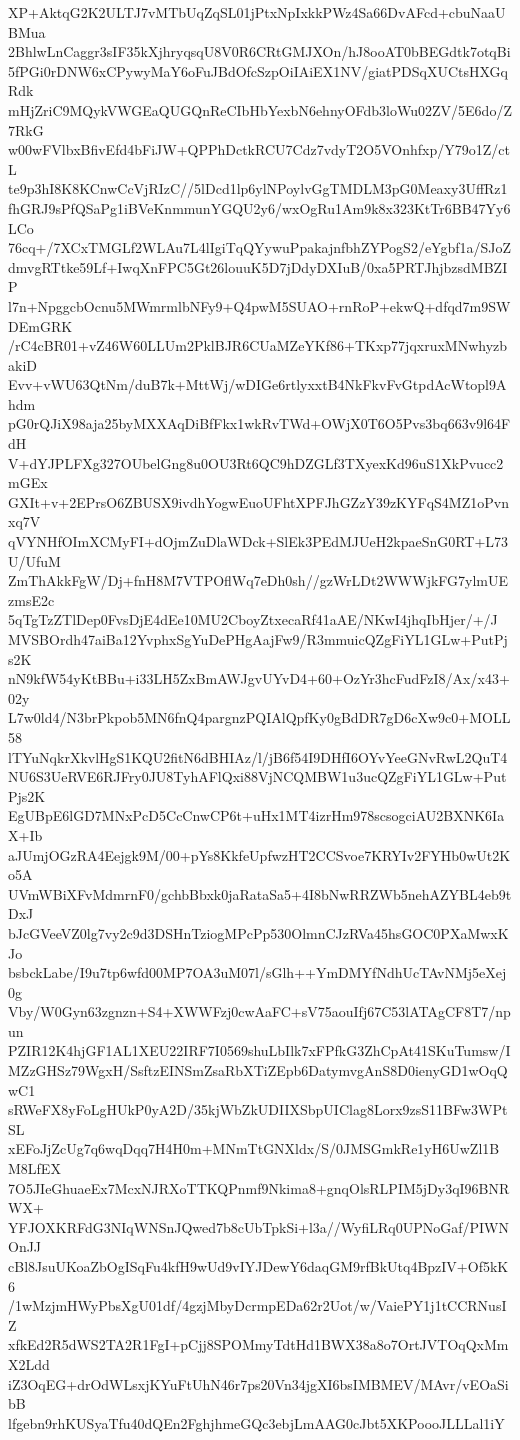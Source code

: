 XP+AktqG2K2ULTJ7vMTbUqZqSL01jPtxNpIxkkPWz4Sa66DvAFcd+cbuNaaUBMua
2BhlwLnCaggr3sIF35kXjhryqsqU8V0R6CRtGMJXOn/hJ8ooAT0bBEGdtk7otqBi
5fPGi0rDNW6xCPywyMaY6oFuJBdOfcSzpOiIAiEX1NV/giatPDSqXUCtsHXGqRdk
mHjZriC9MQykVWGEaQUGQnReCIbHbYexbN6ehnyOFdb3loWu02ZV/5E6do/Z7RkG
w00wFVlbxBfivEfd4bFiJW+QPPhDctkRCU7Cdz7vdyT2O5VOnhfxp/Y79o1Z/ctL
te9p3hI8K8KCnwCcVjRIzC//5lDcd1lp6ylNPoylvGgTMDLM3pG0Meaxy3UffRz1
fhGRJ9sPfQSaPg1iBVeKnmmunYGQU2y6/wxOgRu1Am9k8x323KtTr6BB47Yy6LCo
76cq+/7XCxTMGLf2WLAu7L4lIgiTqQYywuPpakajnfbhZYPogS2/eYgbf1a/SJoZ
dmvgRTtke59Lf+IwqXnFPC5Gt26louuK5D7jDdyDXIuB/0xa5PRTJhjbzsdMBZIP
l7n+NpggcbOcnu5MWmrmlbNFy9+Q4pwM5SUAO+rnRoP+ekwQ+dfqd7m9SWDEmGRK
/rC4cBR01+vZ46W60LLUm2PklBJR6CUaMZeYKf86+TKxp77jqxruxMNwhyzbakiD
Evv+vWU63QtNm/duB7k+MttWj/wDIGe6rtlyxxtB4NkFkvFvGtpdAcWtopl9Ahdm
pG0rQJiX98aja25byMXXAqDiBfFkx1wkRvTWd+OWjX0T6O5Pvs3bq663v9l64FdH
V+dYJPLFXg327OUbelGng8u0OU3Rt6QC9hDZGLf3TXyexKd96uS1XkPvucc2mGEx
GXIt+v+2EPrsO6ZBUSX9ivdhYogwEuoUFhtXPFJhGZzY39zKYFqS4MZ1oPvnxq7V
qVYNHfOImXCMyFI+dOjmZuDlaWDck+SlEk3PEdMJUeH2kpaeSnG0RT+L73U/UfuM
ZmThAkkFgW/Dj+fnH8M7VTPOflWq7eDh0sh//gzWrLDt2WWWjkFG7ylmUEzmsE2c
5qTgTzZTlDep0FvsDjE4dEe10MU2CboyZtxecaRf41aAE/NKwI4jhqIbHjer/+/J
MVSBOrdh47aiBa12YvphxSgYuDePHgAajFw9/R3mmuicQZgFiYL1GLw+PutPjs2K
nN9kfW54yKtBBu+i33LH5ZxBmAWJgvUYvD4+60+OzYr3hcFudFzI8/Ax/x43+02y
L7w0ld4/N3brPkpob5MN6fnQ4pargnzPQIAlQpfKy0gBdDR7gD6cXw9c0+MOLL58
lTYuNqkrXkvlHgS1KQU2fitN6dBHIAz/l/jB6f54I9DHfI6OYvYeeGNvRwL2QuT4
NU6S3UeRVE6RJFry0JU8TyhAFlQxi88VjNCQMBW1u3ucQZgFiYL1GLw+PutPjs2K
EgUBpE6lGD7MNxPcD5CcCnwCP6t+uHx1MT4izrHm978scsogciAU2BXNK6IaX+Ib
aJUmjOGzRA4Eejgk9M/00+pYs8KkfeUpfwzHT2CCSvoe7KRYIv2FYHb0wUt2Ko5A
UVmWBiXFvMdmrnF0/gchbBbxk0jaRataSa5+4I8bNwRRZWb5nehAZYBL4eb9tDxJ
bJcGVeeVZ0lg7vy2c9d3DSHnTziogMPcPp530OlmnCJzRVa45hsGOC0PXaMwxKJo
bsbckLabe/I9u7tp6wfd00MP7OA3uM07l/sGlh++YmDMYfNdhUcTAvNMj5eXej0g
Vby/W0Gyn63zgnzn+S4+XWWFzj0cwAaFC+sV75aouIfj67C53lATAgCF8T7/npun
PZIR12K4hjGF1AL1XEU22IRF7I0569shuLbIlk7xFPfkG3ZhCpAt41SKuTumsw/I
MZzGHSz79WgxH/SsftzEINSmZsaRbXTiZEpb6DatymvgAnS8D0ienyGD1wOqQwC1
sRWeFX8yFoLgHUkP0yA2D/35kjWbZkUDIIXSbpUIClag8Lorx9zsS11BFw3WPtSL
xEFoJjZcUg7q6wqDqq7H4H0m+MNmTtGNXldx/S/0JMSGmkRe1yH6UwZl1BM8LfEX
7O5JIeGhuaeEx7McxNJRXoTTKQPnmf9Nkima8+gnqOlsRLPIM5jDy3qI96BNRWX+
YFJOXKRFdG3NIqWNSnJQwed7b8cUbTpkSi+l3a//WyfiLRq0UPNoGaf/PIWNOnJJ
cBl8JsuUKoaZbOgISqFu4kfH9wUd9vIYJDewY6daqGM9rfBkUtq4BpzIV+Of5kK6
/1wMzjmHWyPbsXgU01df/4gzjMbyDcrmpEDa62r2Uot/w/VaiePY1j1tCCRNusIZ
xfkEd2R5dWS2TA2R1FgI+pCjj8SPOMmyTdtHd1BWX38a8o7OrtJVTOqQxMmX2Ldd
iZ3OqEG+drOdWLsxjKYuFtUhN46r7ps20Vn34jgXI6bsIMBMEV/MAvr/vEOaSibB
lfgebn9rhKUSyaTfu40dQEn2FghjhmeGQc3ebjLmAAG0cJbt5XKPoooJLLLal1iY
